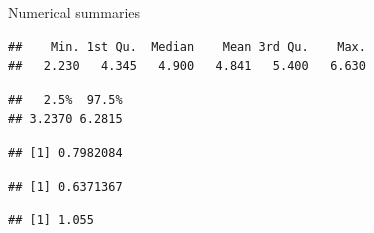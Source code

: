 \documentclass[
  ignorenonframetext,
]{beamer}
\newenvironment{Shaded}{\begin{snugshade}}{\end{snugshade}}
\newcommand{\FloatTok}[1]{\textcolor[rgb]{0.00,0.00,0.81}{#1}}
\newcommand{\KeywordTok}[1]{\textcolor[rgb]{0.13,0.29,0.53}{\textbf{#1}}}
\newcommand{\NormalTok}[1]{#1}
\newcommand{\OperatorTok}[1]{\textcolor[rgb]{0.81,0.36,0.00}{\textbf{#1}}}
\begin{document}
\begin{frame}[fragile]{Numerical summaries}
\protect\hypertarget{numerical-summaries}{}

\begin{Shaded}
\end{Shaded}

\begin{verbatim}
##    Min. 1st Qu.  Median    Mean 3rd Qu.    Max. 
##   2.230   4.345   4.900   4.841   5.400   6.630
\end{verbatim}

\begin{Shaded}
\end{Shaded}

\begin{verbatim}
##   2.5%  97.5% 
## 3.2370 6.2815
\end{verbatim}

\begin{Shaded}
\end{Shaded}

\begin{verbatim}
## [1] 0.7982084
\end{verbatim}

\begin{Shaded}
\end{Shaded}

\begin{verbatim}
## [1] 0.6371367
\end{verbatim}

\begin{Shaded}
\end{Shaded}

\begin{verbatim}
## [1] 1.055
\end{verbatim}

\end{frame}
\end{document}
